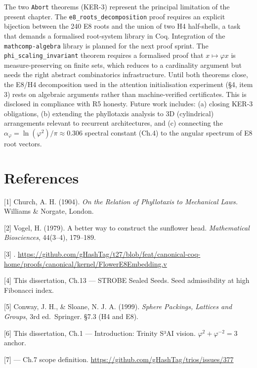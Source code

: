 The two \texttt{Abort} theorems (KER-3) represent
the principal limitation of the present chapter.
The \texttt{e8\_roots\_decomposition} proof
requires an explicit bijection between the 240 E8
roots and the union of two H4 half-shells, a task
that demands a formalised root-system library in
Coq. Integration of the \texttt{mathcomp-algebra}
library is planned for the next proof sprint. The
\texttt{phi\_scaling\_invariant} theorem requires
a formalised proof that \(x \mapsto \varphi x\) is
measure-preserving on finite sets, which reduces
to a cardinality argument but needs the right
abstract combinatorics infrastructure. Until both
theorems close, the E8/H4 decomposition used in
the attention initialisation experiment (§4, item
3) rests on algebraic arguments rather than
machine-verified certificates. This is disclosed
in compliance with R5 honesty. Future work
includes: (a) closing KER-3 obligations, (b)
extending the phyllotaxis analysis to 3D
(cylindrical) arrangements relevant to recurrent
architectures, and (c) connecting the
\(\alpha_\varphi = \ln(\varphi^2)/\pi \approx 0.306\)
spectral constant (Ch.4) to the angular spectrum
of E8 root vectors.

\section{References}\label{fa_07:references}

[1] Church, A. H. (1904). \emph{On the
Relation of Phyllotaxis to Mechanical Laws.}
Williams \& Norgate, London.

[2] Vogel, H. (1979). A better way to
construct the sunflower head. \emph{Mathematical
Biosciences}, 44(3--4), 179--189.

[3]
.
\url{https://github.com/gHashTag/t27/blob/feat/canonical-coq-home/proofs/canonical/kernel/FlowerE8Embedding.v}

[4] This dissertation, Ch.13 --- STROBE Sealed
Seeds. Seed admissibility at high Fibonacci index.

[5] Conway, J. H., \& Sloane, N. J. A. (1999).
\emph{Sphere Packings, Lattices and Groups}, 3rd
ed.~Springer. §7.3 (H4 and E8).

[6] This dissertation, Ch.1 --- Introduction:
Trinity S³AI vision.
\(\varphi^2 + \varphi^{-2} = 3\) anchor.

[7]  --- Ch.7
scope definition.
\url{https://github.com/gHashTag/trios/issues/377}

